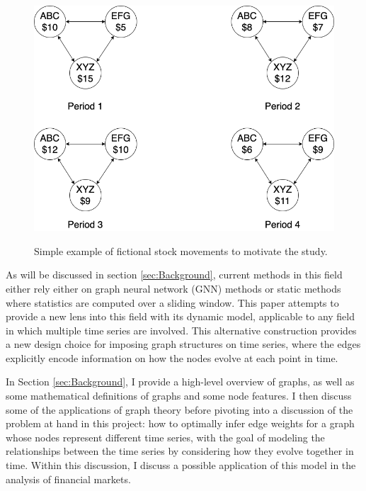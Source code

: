 \documentclass[12pt]{article}
\theoremstyle{definition}
\begin{document}
\begin{figure}[hbt!]
    \par
    \begin{center}
    \caption{Simple example of fictional stock movements to motivate the study.}
    \vspace{0.1in}
    \label{fig:motivatingExample}
    \includegraphics[scale=0.4]{Figures/ExampleGraph.png}
    \end{center}
    \par
    \vspace{-0.25in}
    \medskip
\end{figure}


As will be discussed in section \ref{sec:Background}, current methods in this field either rely either on graph neural network (GNN) methods or static methods where statistics are computed over a sliding window. This paper attempts to provide a new lens into this field with its dynamic model, applicable to any field in which multiple time series are involved. This alternative construction provides a new design choice for imposing graph structures on time series, where the edges explicitly encode information on how the nodes evolve at each point in time.

In Section \ref{sec:Background}, I provide a high-level overview of graphs, as well as some mathematical definitions of graphs and some node features. I then discuss some of the applications of graph theory before pivoting into a discussion of the problem at hand in this project: how to optimally infer edge weights for a graph whose nodes represent different time series, with the goal of modeling the relationships between the time series by considering how they evolve together in time. Within this discussion, I discuss a possible application of this model in the analysis of financial markets. 
\end{document}
